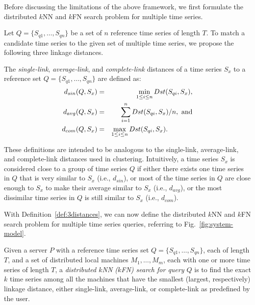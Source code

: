 Before discussing the limitations of the above framework, we first
formulate the distributed $k$NN and $k$FN search problem for multiple
time series.

Let $Q=\{S_{q1},\ldots,S_{qn}\}$ be a set of
$n$ reference time series of length $T$. To match a candidate time
series to the given set of multiple time series, we propose the
following three linkage distances.
\begin{definition} \label{def:3distances}
The \emph{single-link}, \emph{average-link}, and \emph{complete-link}
distances of a time series $S_x$ to a reference set
$Q=\{S_{q1},\ldots,S_{qn}\}$ are defined as:
{\small
\begin{eqnarray*}
d_{sin}(Q, S_x) & = & \min_{1\leq i \leq n}Dst(S_{qi},S_x), \\
d_{avg}(Q, S_x) & = & \sum_{i=1}^{n} Dst(S_{qi},S_x)/n, \text{ and}\\
d_{com}(Q, S_x) & = & \max_{1\leq i \leq n}Dst(S_{qi},S_x). 
\hspace{0.5in}
\end{eqnarray*}}
\end{definition}

These definitions are intended to be analogous to the single-link, average-link, and
complete-link distances used in clustering.  Intuitively, a time
series $S_x$ is considered close to a group of time series $Q$ if either
there exists one time series in $Q$ that is very similar to $S_x$
(i.e., $d_{sin}$), or most of the time series in $Q$ are close
enough to $S_x$ to make their average similar to $S_x$ (i.e., $d_{avg}$), 
or the most dissimilar time series in $Q$ is
still similar to $S_x$ (i.e., $d_{com}$).

With Definition~\ref{def:3distances}, we can now define the distributed $k$NN and
$k$FN search problem for multiple time series queries, referring to Fig.~\ref{fig:system-model}.

\begin{definition}
Given a server $P$ with a reference time series set
$Q=\{S_{q1},\ldots,S_{qn}\}$, each of length $T$, and a set of
distributed local machines $M_1,\ldots,M_m$, each with one or more
time series of length $T$, a \emph{distributed $k$NN ($k$FN) search
for query $Q$} is to find the exact $k$ time series among all the
machines that have the smallest (largest, respectively) linkage
distance, either single-link, average-link, or complete-link as
predefined by the user.  \hfill
\end{definition}

